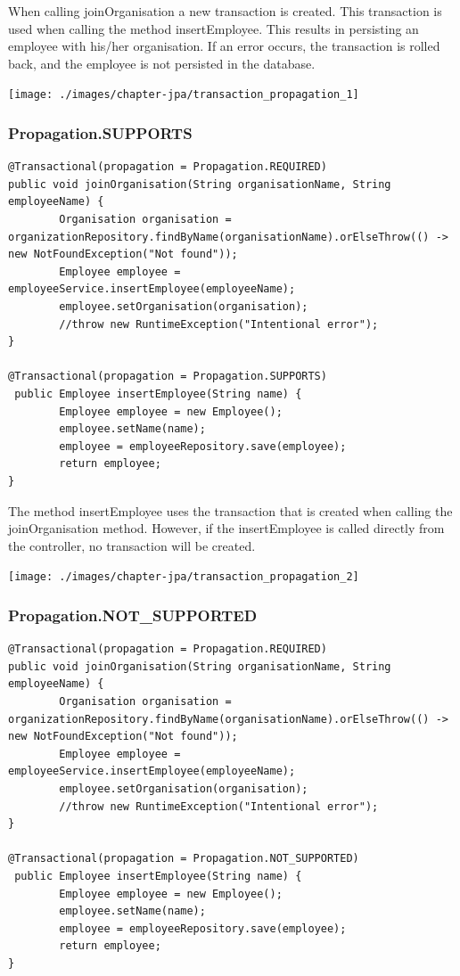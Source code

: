 When calling joinOrganisation a new transaction is created. This transaction is used when calling the method insertEmployee. This results in persisting an employee with his/her organisation. If an error occurs, the transaction is rolled back, and the employee is not persisted in the database. 

\texttt{[image: ./images/chapter-jpa/transaction\_propagation\_1]}


\subsubsection{Propagation.SUPPORTS}

\begin{lstlisting}
@Transactional(propagation = Propagation.REQUIRED)
public void joinOrganisation(String organisationName, String employeeName) {
        Organisation organisation = organizationRepository.findByName(organisationName).orElseThrow(() -> new NotFoundException("Not found"));
        Employee employee = employeeService.insertEmployee(employeeName);
        employee.setOrganisation(organisation);
        //throw new RuntimeException("Intentional error");
}

@Transactional(propagation = Propagation.SUPPORTS)
 public Employee insertEmployee(String name) {
        Employee employee = new Employee();
        employee.setName(name);
        employee = employeeRepository.save(employee);
        return employee;
}
\end{lstlisting}

The method insertEmployee uses the transaction that is created when calling the joinOrganisation method. However, if the insertEmployee is called directly from the controller, no transaction will be created.

\texttt{[image: ./images/chapter-jpa/transaction\_propagation\_2]}

\subsubsection{Propagation.NOT\_SUPPORTED}

\begin{lstlisting}
@Transactional(propagation = Propagation.REQUIRED)
public void joinOrganisation(String organisationName, String employeeName) {
        Organisation organisation = organizationRepository.findByName(organisationName).orElseThrow(() -> new NotFoundException("Not found"));
        Employee employee = employeeService.insertEmployee(employeeName);
        employee.setOrganisation(organisation);
        //throw new RuntimeException("Intentional error");
}

@Transactional(propagation = Propagation.NOT_SUPPORTED)
 public Employee insertEmployee(String name) {
        Employee employee = new Employee();
        employee.setName(name);
        employee = employeeRepository.save(employee);
        return employee;
}
\end{lstlisting}

